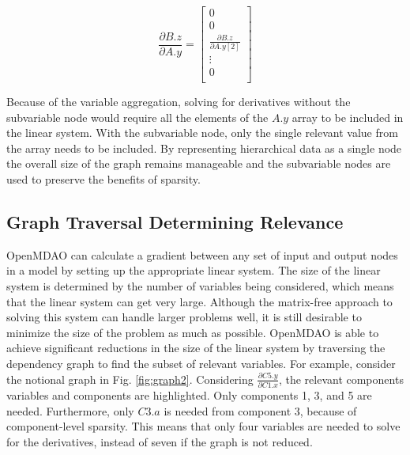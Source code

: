 \documentclass[]{aiaa-tc} %
\begin{document}
    \begin{equation}
        \frac{\partial B.z}{\partial A.y} =
        \begin{bmatrix}
            0 \\
            0 \\
            \frac{\partial B.z}{\partial A.y[2]} \\
            \vdots \\
            0 \\
        \end{bmatrix}
        \label{eqn:sparse_gradient}
    \end{equation}

    Because of the variable aggregation, solving for derivatives without the subvariable node would require
    all the elements of the $A.y$ array to be included in the linear system.
    With the subvariable node, only the single relevant value from the array needs to be included.
    By representing hierarchical data as a single node the overall size of the graph
    remains manageable and the subvariable nodes are used to preserve the benefits of sparsity.


    \subsection{Graph Traversal Determining Relevance}

        OpenMDAO can calculate a gradient between any set of input and output nodes in a
        model by setting up the appropriate linear system. The size of the linear system
        is determined by the number of variables being considered, which means that the linear
        system can get very large. Although the matrix-free approach to solving this system
        can handle larger problems well, it is still desirable to minimize the size of the problem
        as much as possible. OpenMDAO is able to achieve significant reductions in the
        size of the linear system by traversing the dependency graph to find the subset of relevant variables.
        For example, consider the notional graph in Fig. \ref{fig:graph2}. Considering $\frac{\partial C5.y}{\partial C1.x}$,
        the relevant components variables and components are highlighted. Only components 1, 3, and 5 are needed.
        Furthermore, only $C3.a$ is needed from component 3, because of component-level sparsity.
        This means that only four variables are needed to solve for the derivatives,
        instead of seven if the graph is not reduced.
\end{document}
